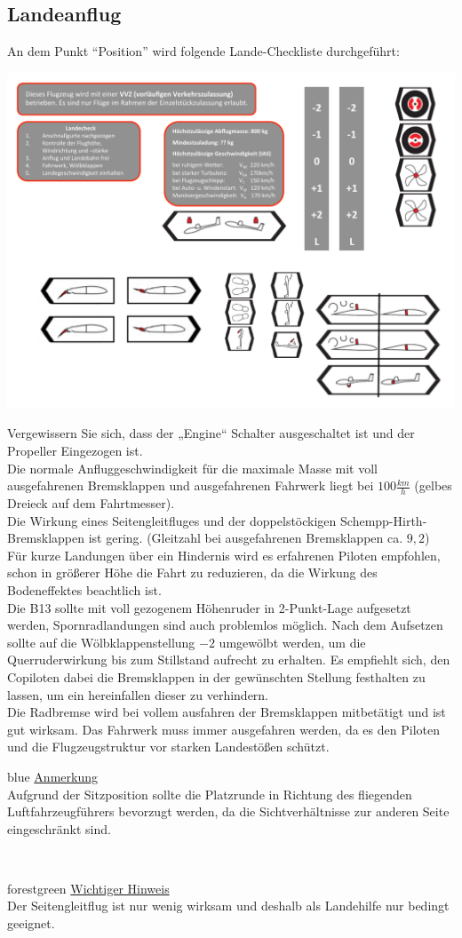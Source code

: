 \newpage
\subsection{Landeanflug}
An dem Punkt "`Position"' wird folgende Lande-Checkliste durchgeführt:
\newline
\begin{center}
\includegraphics[width=.45\textwidth]{bilder/landecheck.pdf}
\end{center}

Vergewissern Sie sich, dass der „Engine“ Schalter ausgeschaltet ist und der Propeller Eingezogen ist.\\

Die normale Anfluggeschwindigkeit für die maximale Masse mit voll ausgefahrenen Bremsklappen und ausgefahrenen Fahrwerk liegt bei $100 \frac{km}{h}$ (gelbes Dreieck auf dem Fahrtmesser).\\
Die Wirkung eines Seitengleitfluges und der doppelstöckigen Schempp-Hirth-Bremsklappen ist gering. (Gleitzahl bei ausgefahrenen Bremsklappen ca. $9,2$) \\
Für kurze Landungen über ein Hindernis wird es erfahrenen Piloten empfohlen, schon in größerer Höhe die Fahrt zu reduzieren, da die Wirkung des Bodeneffektes beachtlich ist.\\
Die B13 sollte mit voll gezogenem Höhenruder in 2-Punkt-Lage aufgesetzt werden, Spornradlandungen sind auch problemlos möglich. Nach dem Aufsetzen sollte auf die Wölbklappenstellung $-2$ umgewölbt werden, um die Querruderwirkung bis zum Stillstand aufrecht zu erhalten. Es empfiehlt sich, den Copiloten dabei die Bremsklappen in der gewünschten Stellung festhalten zu lassen, um ein hereinfallen dieser zu verhindern. \\
Die Radbremse wird bei vollem ausfahren der Bremsklappen mitbetätigt und ist gut wirksam.
Das Fahrwerk muss immer ausgefahren werden, da es den Piloten und die Flugzeugstruktur vor starken Landestößen schützt.\\
\newline
\begin{color}{blue}
\large{\underline{Anmerkung}}\\
Aufgrund der Sitzposition sollte die Platzrunde in Richtung des fliegenden Luftfahrzeugführers bevorzugt werden, da die Sichtverhältnisse zur anderen Seite eingeschränkt sind.
\end{color}\\
\newline
\begin{color}{forestgreen}
\large{\underline{Wichtiger Hinweis}}\\
Der Seitengleitflug ist nur wenig wirksam und deshalb als Landehilfe nur bedingt geeignet.
\end{color}\\
